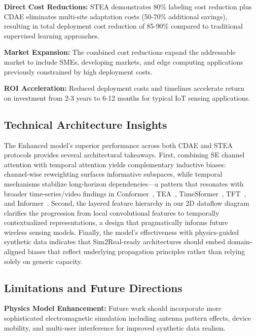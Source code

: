 \documentclass[journal]{IEEEtran}
\begin{document}
\textbf{Direct Cost Reductions:} STEA demonstrates 80\% labeling cost reduction plus CDAE eliminates multi-site adaptation costs (50-70\% additional savings), resulting in total deployment cost reduction of 85-90\% compared to traditional supervised learning approaches.

\textbf{Market Expansion:} The combined cost reductions expand the addressable market to include SMEs, developing markets, and edge computing applications previously constrained by high deployment costs.

\textbf{ROI Acceleration:} Reduced deployment costs and timelines accelerate return on investment from 2-3 years to 6-12 months for typical IoT sensing applications.

\subsection{Technical Architecture Insights}

The Enhanced model's superior performance across both CDAE and STEA protocols provides several architectural takeaways. First, combining SE channel attention with temporal attention yields complementary inductive biases: channel-wise reweighting surfaces informative subspaces, while temporal mechanisms stabilize long-horizon dependencies—a pattern that resonates with broader time-series/video findings in Conformer~\cite{gulati2020conformer}, TEA~\cite{li2020tea}, TimeSformer~\cite{bertasius2021timesformer}, TFT~\cite{lim2021tft}, and Informer~\cite{zhou2021informer}. Second, the layered feature hierarchy in our 2D dataflow diagram clarifies the progression from local convolutional features to temporally contextualized representations, a design that pragmatically informs future wireless sensing models. Finally, the model's effectiveness with physics-guided synthetic data indicates that Sim2Real-ready architectures should embed domain-aligned biases that reflect underlying propagation principles rather than relying solely on generic capacity.

\subsection{Limitations and Future Directions}

\textbf{Physics Model Enhancement:} Future work should incorporate more sophisticated electromagnetic simulation including antenna pattern effects, device mobility, and multi-user interference for improved synthetic data realism.
\end{document}
